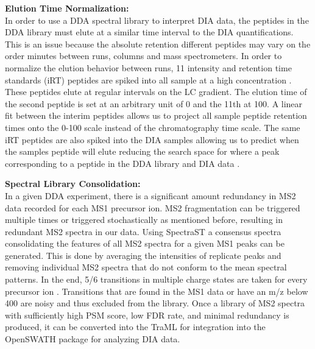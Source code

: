 \documentclass[a4paper,11pt,twoside]{book}
\begin{document}
	\textbf{Elution Time Normalization:}\\
	In order to use a DDA spectral library to interpret DIA data, the peptides in the DDA library must elute at a similar time interval to the DIA quantifications. This is an issue because the absolute retention different peptides may vary on the order minutes between runs, columns and mass spectrometers. In order to normalize the elution behavior between runs, 11 intensity and retention time standards (iRT) peptides are spiked into all sample at a high concentration \citep{Bruderer2016HighprecisioniRT}. These peptides elute at regular intervals on the LC gradient. The elution time of the second peptide is set at an arbitrary unit of 0 and the 11th at 100. A linear fit between the interim peptides allows us to project all sample peptide retention times onto the 0-100 scale instead of the chromatography time scale. The same iRT peptides are also spiked into the DIA samples allowing us to predict when the samples peptide will elute reducing the search space for where a peak corresponding to a peptide in the DDA library and DIA data \citep{Bruderer2016HighprecisioniRT}.

	\textbf{Spectral Library Consolidation:}\\
	In a given DDA experiment, there is a significant amount redundancy in MS2 data recorded for each MS1 precursor ion. MS2 fragmentation can be triggered multiple times or triggered stochastically as mentioned before, resulting in redundant MS2 spectra in our data. Using SpectraST a consensus spectra consolidating the features of all MS2 spectra for a given MS1 peaks can be generated. This is done by averaging the intensities of replicate peaks and removing individual MS2 spectra that do not conform to the mean spectral patterns\citep{Lam2008BuildingProteomics}. In the end, 5/6 transitions in multiple charge states are taken for every precursor ion \citep{Schubert2015BuildingData}. Transitions that are found in the MS1 data or have an m/z below 400 are noisy and thus excluded from the library. Once a library of MS2 spectra with sufficiently high PSM score, low FDR rate, and minimal redundancy is produced, it can be converted into the TraML for integration into the OpenSWATH package for analyzing DIA data.
	
\end{document}

